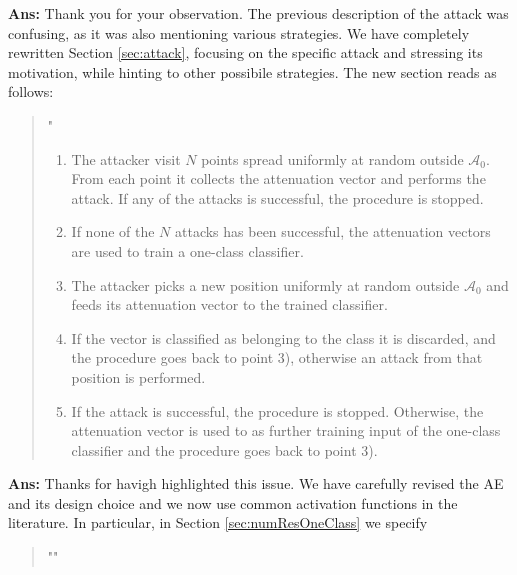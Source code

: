 \documentclass[draftcls,onecolumn,12pt]{IEEEtran}
\newcounter{revc}
\newcommand{\revp}[1]{\zref[revcontent]{#1}}
\begin{document}
\begin{framed}
\end{framed}
{\bf Ans:} Thank you for your observation. The previous description of the attack was confusing, as it was also mentioning various strategies. We have completely rewritten Section \ref{sec:attack}, focusing on the specific attack and stressing its motivation, while hinting to other possibile strategies. The new section reads as follows:
\begin{quote}
    "\revp{sezattack}
\begin{enumerate}
    \item The attacker visit  $N$  points spread uniformly at random outside $\mathcal A_0$. From each point it collects the attenuation vector and performs the attack. If any of the attacks is successful, the procedure is stopped.
    \item If none of the $N$ attacks has been successful, the attenuation vectors are used to train a one-class classifier.
    \item The attacker picks a new position uniformly at random outside $\mathcal A_0$ and feeds its attenuation vector to the trained classifier.
    \item If the vector is classified as belonging to the class it is discarded, and the procedure goes back to point 3), otherwise an attack from that position is performed.
    \item If the attack is successful, the procedure is stopped. Otherwise, the attenuation vector is used to as further training input of the one-class classifier and the procedure goes back to point 3).
\end{enumerate}
\revp{sezattack2} 
\end{quote}


\vspace{5mm} %
\begin{framed}
\end{framed}


{\bf Ans:} 
Thanks for havigh highlighted this issue. We have carefully revised the AE and its design choice and we now use common activation functions in the literature. In particular, in Section \ref{sec:numResOneClass} we specify
\begin{quote}
"\revp{designAE}"
\end{quote}
\end{document}

